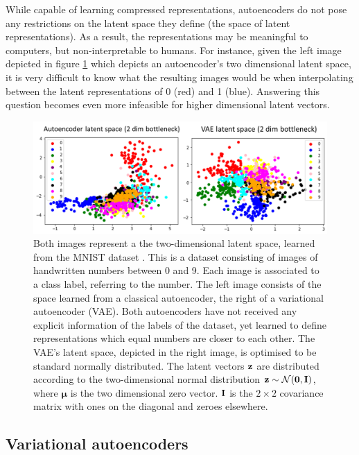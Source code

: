 While capable of learning compressed representations, autoencoders do not pose any restrictions on the latent space they define (the space of latent representations). As a result, the representations may be meaningful to computers, but non-interpretable to humans. For instance, given the left image depicted in figure \ref{fig:latent_space_2d} which depicts an autoencoder's two dimensional latent space, it is very difficult to know what the resulting images would be when interpolating between the latent representations of 0 (red) and 1 (blue). Answering this question becomes even more infeasible for higher dimensional latent vectors.

\begin{figure}
	\centering
	\includegraphics[width=0.7\linewidth]{screenshot021}
	\caption{ Both images represent a the two-dimensional latent space, learned from the MNIST dataset \cite{PapersCodeMNIST}. This is a dataset consisting of images of handwritten numbers between 0 and 9. Each image is associated to a class label, referring to the number. The left image consists of the space learned from a classical autoencoder, the right of a variational autoencoder (VAE). Both autoencoders have not received any explicit information of the labels of the dataset, yet learned to define representations which equal numbers are closer to each other. The VAE's latent space, depicted in the right image, is optimised to be standard normally distributed. The latent vectors $\mathbf{z}$ are distributed according to the two-dimensional normal distribution $\mathbf{z} \sim \mathcal{N}(\bm{\mathbf{0}}, \mathbf{I})$, where $\bm{\mu}$ is the two dimensional zero vector. $\mathbf{I}$ is the $2 \times 2$ covariance matrix with ones on the diagonal and zeroes elsewhere.}
	\label{fig:latent_space_2d}
\end{figure}

\subsection{Variational autoencoders}


